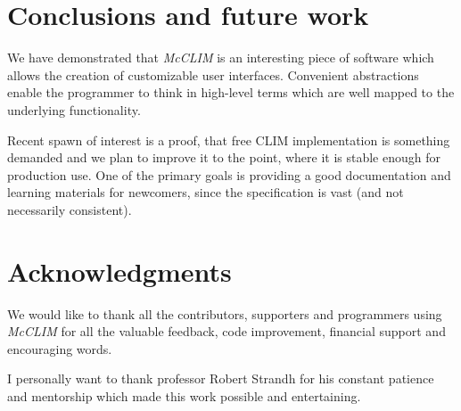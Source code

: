\documentclass{sig-alternate-05-2015}
\begin{document}
\section{Conclusions and future work}

We have demonstrated that \emph{McCLIM} is an interesting piece of
software which allows the creation of customizable user
interfaces. Convenient abstractions enable the programmer to think in
high-level terms which are well mapped to the underlying
functionality.

Recent spawn of interest is a proof, that free CLIM implementation is
something demanded and we plan to improve it to the point, where it is
stable enough for production use. One of the primary goals is
providing a good documentation and learning materials for newcomers,
since the specification is vast (and not necessarily consistent).

\section{Acknowledgments} 

We would like to thank all the contributors, supporters and
programmers using \emph{McCLIM} for all the valuable feedback, code
improvement, financial support and encouraging words.

I personally want to thank professor Robert Strandh for his constant
patience and mentorship which made this work possible and
entertaining.



\end{document}
